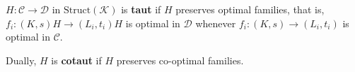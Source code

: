 $H: \mathcal{C} \longrightarrow \mathcal{D}$ in $\text{Struct}(\mathcal{K})$ is \textbf{taut} if $H$ preserves optimal families, that is, $f_i: (K, s)H \longrightarrow (L_i, t_i)H$ is optimal in $\mathcal{D}$ whenever $f_i: (K, s) \longrightarrow (L_i, t_i)$ is optimal in $\mathcal{C}$.

Dually, $H$ is \textbf{cotaut} if $H$ preserves co-optimal families.
